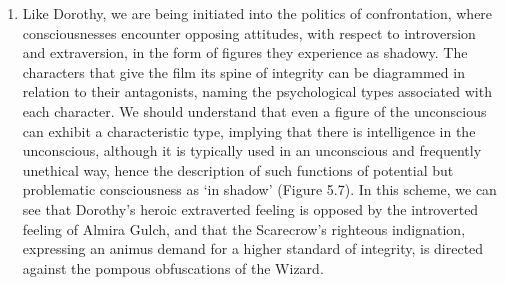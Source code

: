 \begin{enumerate}
\item {} Like Dorothy, we are being initiated into the politics of
confrontation, where consciousnesses encounter opposing attitudes, with respect
to introversion and extraversion, in the form of figures they experience as
shadowy. The characters that give the film its spine of integrity can be
diagrammed in relation to their antagonists, naming the psychological types
associated with each character. We should understand that even a figure of the
unconscious can exhibit a characteristic type, implying that there is
intelligence in the unconscious, although it is typically used in an
unconscious and frequently unethical way, hence the description of such
functions of potential but problematic consciousness as ‘in shadow’ (Figure
5.7). In this scheme, we can see that Dorothy’s heroic extraverted feeling is
opposed by the introverted feeling of Almira Gulch, and that the Scarecrow’s
righteous indignation, expressing an animus demand for a higher standard of
integrity, is directed against the pompous obfuscations of the Wizard.

\end{enumerate}
